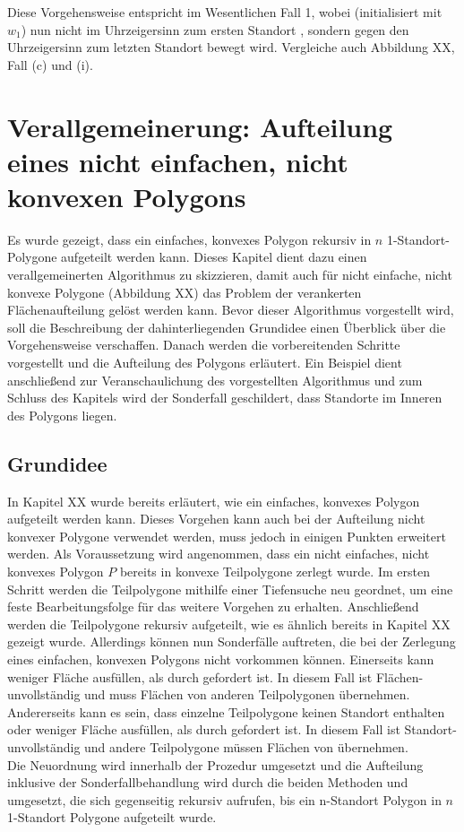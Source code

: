 \documentclass[ngerman]{seminarbeitrag}
\begin{document}
Diese Vorgehensweise entspricht im Wesentlichen Fall 1, wobei \ls (initialisiert mit $w_{1}$) nun nicht im Uhrzeigersinn zum ersten Standort , sondern gegen den Uhrzeigersinn zum letzten Standort  bewegt wird. Vergleiche auch Abbildung XX, Fall (c) und (i).
\section{Verallgemeinerung: Aufteilung eines nicht einfachen, nicht konvexen Polygons}\label{nicht konvex}
Es wurde gezeigt, dass ein einfaches, konvexes Polygon rekursiv in $n$ 1-Standort-Polygone aufgeteilt werden kann. Dieses Kapitel dient dazu einen verallgemeinerten Algorithmus zu skizzieren, damit auch für nicht einfache, nicht konvexe Polygone (Abbildung XX) das Problem der verankerten Flächenaufteilung gelöst werden kann.
Bevor dieser Algorithmus vorgestellt wird, soll die Beschreibung der dahinterliegenden Grundidee einen Überblick über die Vorgehensweise verschaffen. Danach werden die vorbereitenden Schritte vorgestellt und die Aufteilung des Polygons erläutert. Ein Beispiel dient anschließend zur Veranschaulichung des vorgestellten Algorithmus und zum Schluss des Kapitels wird der Sonderfall geschildert, dass Standorte im Inneren des Polygons liegen.

\subsection{Grundidee}\label{grundidee nicht konvex}
In Kapitel XX wurde bereits erläutert, wie ein einfaches, konvexes Polygon aufgeteilt werden kann. Dieses Vorgehen kann auch bei der Aufteilung nicht konvexer Polygone verwendet werden, muss jedoch in einigen Punkten erweitert werden.
Als Voraussetzung wird angenommen, dass ein nicht einfaches, nicht konvexes Polygon $P$ bereits in konvexe Teilpolygone \cpp zerlegt wurde. Im ersten Schritt werden die Teilpolygone mithilfe einer Tiefensuche neu geordnet, um eine feste Bearbeitungsfolge für das weitere Vorgehen zu erhalten. Anschließend werden die Teilpolygone rekursiv aufgeteilt, wie es ähnlich bereits in Kapitel XX gezeigt wurde. Allerdings können nun Sonderfälle auftreten, die bei der Zerlegung eines einfachen, konvexen Polygons nicht vorkommen können. Einerseits kann \cpi weniger Fläche ausfüllen, als durch  gefordert ist. In diesem Fall ist \cpi Flächen-unvollständig und muss Flächen von anderen Teilpolygonen übernehmen. Andererseits kann es sein, dass einzelne Teilpolygone keinen Standort enthalten oder weniger Fläche ausfüllen, als durch  gefordert ist. In diesem Fall ist \cpi Standort-unvollständig und andere Teilpolygone müssen Flächen von \cpi übernehmen.\\
Die Neuordnung wird innerhalb der Prozedur \ord umgesetzt und die Aufteilung inklusive der Sonderfallbehandlung wird durch die beiden Methoden \noncon und \daa umgesetzt, die sich gegenseitig rekursiv aufrufen, bis ein n-Standort Polygon in $n$ 1-Standort Polygone aufgeteilt wurde.
\end{document}
